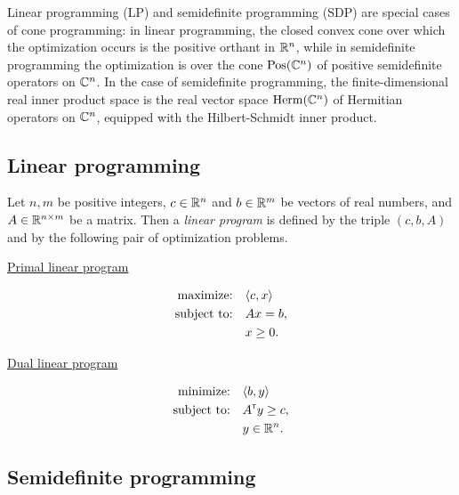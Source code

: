 Linear programming (LP) and semidefinite programming (SDP) are special cases of cone
programming: in linear programming, the closed convex cone over which the
optimization occurs is the positive orthant in $\mathbb{R}^n$, while in semidefinite
programming the optimization is over the cone $\mathrm{Pos}(\mathbb{C}^n)$ of positive
semidefinite operators on $\mathbb{C}^n$.
In the case of semidefinite programming, the finite-dimensional real inner
product space is the real vector space $\mathrm{Herm}(\mathbb{C}^n)$ of Hermitian
operators on $\mathbb{C}^n$, equipped with the Hilbert-Schmidt inner product.

\subsection*{Linear programming}
\label{sec:linear-programming}
Let $n,m$ be positive integers, $c\in\mathbb{R}^{n}$ and $b\in\mathbb{R}^{m}$ be vectors
of real numbers, and $A \in\mathbb{R}^{n\times m}$ be a matrix. Then a \emph{linear program}
is defined by the triple $(c,b,A)$ and by the following pair of optimization problems.
\begin{center}
  \begin{minipage}{2in}
    \centerline{\underline{Primal linear program}}\vspace{-7mm}
    \begin{align*}
      \text{maximize:}\quad & \langle c , x\rangle\\
      \text{subject to:}\quad & A x = b,\\
      & x \geq 0.
    \end{align*}
  \end{minipage}
  \hspace*{1.5cm}
  \begin{minipage}{2.4in}
    \centerline{\underline{Dual linear program}}\vspace{-7mm}
    \begin{align*}
      \text{minimize:}\quad & \langle b , y\rangle\\
      \text{subject to:}\quad & A^{{\scriptscriptstyle\mathsf{T}}}y \geq c,\\
      & y\in\mathbb{R}^{n}.
    \end{align*}
  \end{minipage}
\end{center}


\subsection*{Semidefinite programming}
\label{sec:semidefinite-programming}

